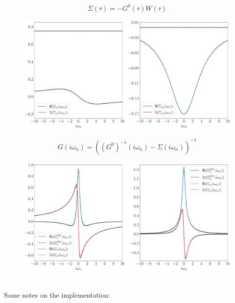 \documentclass[12pt]{article}
\begin{document}
\begin{equation}
\Sigma(\tau)=-G^0(\tau)W(\tau)
\end{equation}
\begin{figure}[h!]
\center
\includegraphics[scale=0.45]{S.pdf}
\end{figure}
\newpage
\noindent
\begin{equation}
G(i\omega_n)=((G^0)^{-1}(i\omega_n)-\Sigma(i\omega_n))^{-1}
\end{equation}
\begin{figure}[h!]
\center
\includegraphics[scale=0.45]{G.pdf}
\end{figure}\\
Some notes on the implementation:
\end{document}
